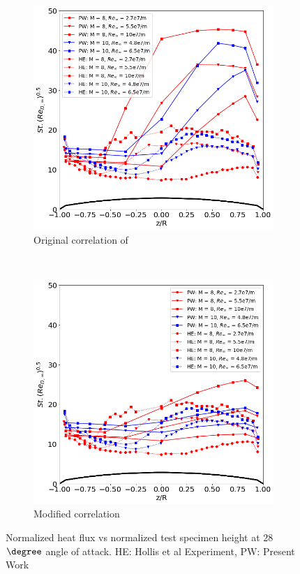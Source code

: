 \documentclass[%
 aip,
 amsmath,amssymb,
preprint,%
]{revtex4-1}
\begin{document}
\begin{figure}[h!]
\centering
\begin{subfigure}[b]{0.49\textwidth}
\centering
\includegraphics[width=\textwidth]{St-28-hollis.png}
\caption{Original correlation of \cite{hollis_aeroheating_2009}}
\label{St-28-hollis}
\end{subfigure}
~
\begin{subfigure}[b]{0.49\textwidth}
\centering
\includegraphics[width=\textwidth]{St-28-hollis-new.png}
\caption{Modified correlation}
\label{St-28-hollis-new}
\end{subfigure}
\caption{Normalized heat flux vs normalized test specimen height at 28$\degree$ angle of attack. HE: Hollis et al Experiment, PW: Present Work}
\end{figure}
\end{document}
